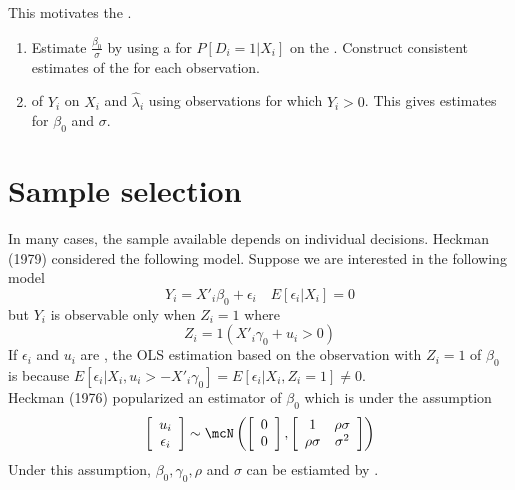 This motivates the .
\begin{enumerate}
    \item Estimate $\frac{\beta_0}{\sigma}$ by using a  for $P[D_i=1|X_i]$ on the .
    Construct consistent estimates of the  for each observation.
    \item {} of $Y_i$ on $X_i$ and $\hat{\lambda}_i$ using observations for which $Y_i>0$. 
    This gives  estimates for $\beta_0$ and $\sigma$.
\end{enumerate}

\section{Sample selection}
In many cases, the sample available depends on individual decisions. 
Heckman (1979) considered the following model. Suppose we are interested in the following model 
\begin{equation*}
    Y_i = X'_i\beta_0+\epsilon_i\quad E[\epsilon_i|X_i] = 0
\end{equation*}
but $Y_i$ is observable only when $Z_i = 1$ where 
\begin{equation*}
    Z_i = 1(X'_i\gamma_0+u_i>0)
\end{equation*}
If $\epsilon_i$ and $u_i$ are , the OLS estimation based on the observation with $Z_i=1$ of $\beta_0$ is 
because $E[\epsilon_i|X_i,u_i>-X'_i\gamma_0] = E[\epsilon_i|X_i,Z_i=1]\neq 0$.\\

Heckman (1976) popularized an estimator of $\beta_0$ which is  under the assumption 
\begin{equation*}
    \left[\begin{array}{c}
        u_i\\ \epsilon_i
    \end{array}\right]\sim\mcN\left(\left[\begin{array}{c}
        0\\0
    \end{array}\right],\left[\begin{array}{cc}
        1 & \rho\sigma\\ \rho\sigma & \sigma^2
    \end{array}\right]\right)
\end{equation*}
Under this assumption, $\beta_0, \gamma_0, \rho$ and $\sigma$ can be estiamted by .\\

